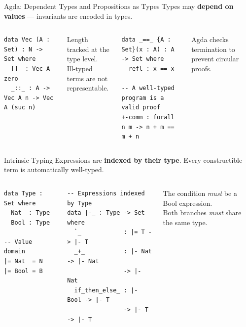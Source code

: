 \documentclass[10pt,compress,aspectratio=169]{beamer}
\begin{document}
\begin{frame}[fragile]{Agda: Dependent Types and Propositions as Types}
  Types may \textbf{depend on values} --- invariants are encoded in types.
  \bigskip
  \begin{columns}[T]
      \begin{verbatim}
data Vec (A : Set) : N -> Set where
  []  : Vec A zero
  _::_ : A -> Vec A n -> Vec A (suc n)
      \end{verbatim}
      {\footnotesize Length tracked at the type level.\\Ill-typed terms are not representable.}
      \begin{verbatim}
data _==_ {A : Set}(x : A) : A -> Set where
  refl : x == x

-- A well-typed program is a valid proof
+-comm : forall n m -> n + m == m + n
      \end{verbatim}
      {\footnotesize Agda checks termination to prevent circular proofs.}
  \end{columns}
\end{frame}

\begin{frame}[fragile]{Intrinsic Typing}
  Expressions are \textbf{indexed by their type}. Every constructible term is automatically well-typed.
  \bigskip
  \begin{columns}[T]
      \begin{verbatim}
data Type : Set where
  Nat  : Type
  Bool : Type

-- Value domain
|= Nat  = N
|= Bool = B
      \end{verbatim}
      \begin{verbatim}
-- Expressions indexed by Type
data |-_ : Type -> Set where
  `_            : |= T -> |- T
  _+_           : |- Nat -> |- Nat
                -> |- Nat
  if_then_else_ : |- Bool -> |- T
                -> |- T -> |- T
      \end{verbatim}
      {\footnotesize The condition \emph{must} be a Bool expression.\\Both branches \emph{must} share the same type.}
  \end{columns}
\end{frame}
\end{document}
